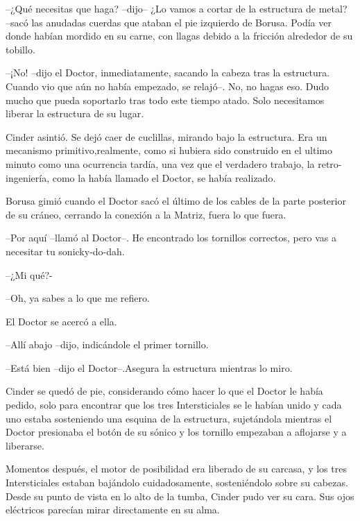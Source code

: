 --¿Qué necesitas que haga? --dijo-- ¿Lo vamos a cortar de la estructura de metal? --sacó las anudadas cuerdas que ataban el pie izquierdo de Borusa. Podía ver donde habían mordido en su carne, con llagas debido a la fricción alrededor de su tobillo.

--¡No! --dijo el Doctor, inmediatamente, sacando la cabeza tras la estructura. Cuando vio que aún no había empezado, se relajó--. No, no hagas eso. Dudo mucho que pueda soportarlo tras todo este tiempo atado. Solo necesitamos liberar la estructura de su lugar.



Cinder asintió. Se dejó caer de cuclillas, mirando bajo la estructura. Era un mecanismo primitivo,realmente, como si hubiera sido construido en el ultimo minuto como una ocurrencia tardía, una vez que el verdadero trabajo, la retro-ingeniería, como la había llamado el Doctor, se había realizado.

Borusa gimió cuando el Doctor sacó el último de los cables de la parte posterior de su cráneo, cerrando la conexión a la Matriz, fuera lo que fuera. 



--Por aquí --llamó al Doctor--. He encontrado los tornillos correctos, pero vas a necesitar tu sonicky-do-dah.

--¿Mi qué?-

--Oh, ya sabes a lo que me refiero.



El Doctor se acercó a ella. 



--Allí abajo --dijo, indicándole el primer tornillo.

--Está bien --dijo el Doctor--.Asegura la estructura mientras lo miro.



Cinder se quedó de pie, considerando cómo hacer lo que el Doctor le había pedido, solo para encontrar que los tres Intersticiales se le habían unido y cada uno estaba sosteniendo una esquina de la estructura, sujetándola mientras el Doctor presionaba el botón de su sónico y los tornillo empezaban a aflojarse y a liberarse.

Momentos después, el motor de posibilidad era liberado de su carcasa, y los tres Intersticiales estaban bajándolo cuidadosamente, sosteniéndolo sobre su cabezas. Desde su punto de vista en lo alto de la tumba, Cinder pudo ver su cara. Sus ojos eléctricos parecían mirar directamente en su alma.



